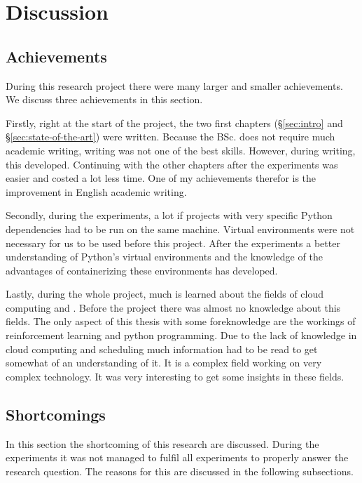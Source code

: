 \chapter{Discussion}\label{sec:discussion}

\section{Achievements}

During this research project there were many larger and smaller achievements.
We discuss three achievements in this section.

Firstly, right at the start of the project, the two first chapters (§\ref{sec:intro}
and §\ref{sec:state-of-the-art}) were written. Because the BSc. \ai does not
require much academic writing, writing was not one of the best skills.
However, during writing, this developed. Continuing with the other chapters
after the experiments was easier and costed a lot less time. One of my
achievements therefor is the improvement in English academic writing.

Secondly, during the experiments, a lot if projects with very specific Python
dependencies had to be run on the same machine. Virtual environments were not
necessary for us to be used before this project. After the experiments a
better understanding of Python's virtual environments and the knowledge of the
advantages of containerizing these environments has developed.

Lastly, during the whole project, much is learned about the fields of cloud
computing and \jss. Before the project there was almost no knowledge about
this fields. The only aspect of this thesis with some foreknowledge are the
workings of reinforcement learning and python programming. Due to the lack of
knowledge in cloud computing and scheduling much information had to be read to
get somewhat of an understanding of it. It is a complex field working on very
complex technology. It was very interesting to get some insights in these
fields.


\section{Shortcomings}

In this section the shortcoming of this research are discussed. During the
experiments it was not managed to fulfil all experiments to properly answer
the research question. The reasons for this are discussed in the following
subsections.


